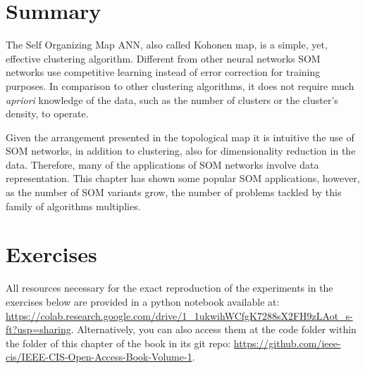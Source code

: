 \section{Summary}

The Self Organizing Map ANN, also called Kohonen map, is a simple, yet, effective clustering algorithm. Different from other neural networks SOM networks use competitive learning instead of error correction for training purposes. In comparison to other clustering algorithms, it does not require much \textit{apriori} knowledge of the data, such as the number of clusters or the cluster's density, to operate. 

Given the arrangement presented in the topological map it is intuitive the use of SOM networks, in addition to clustering, also for dimensionality reduction in the data. Therefore, many of the applications of SOM networks involve data representation. This chapter has shown some popular SOM applications, however, as the number of SOM variants grow, the number of problems tackled by this family of algorithms multiplies.  

\section{Exercises}

All resources necessary for the exact reproduction of the experiments in the exercises below are provided in a python notebook available at: \url{https://colab.research.google.com/drive/1_1ukwihWCfgK7288sX2FH9zLAot_s-ft?usp=sharing}. Alternatively, you can also access them at the code folder within the folder of this chapter of the book in its git repo: \url{https://github.com/ieee-cis/IEEE-CIS-Open-Access-Book-Volume-1}.

